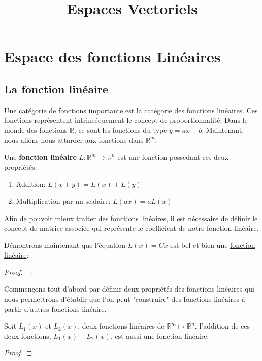 \documentclass[12pt]{report}
\title{Espaces Vectoriels}
\let\Bbb\mathbb
\theoremstyle{definition}
\begin{document}
\chapter{Espace des fonctions Linéaires}
\section{La fonction linéaire}
    Une catégorie de fonctions importante est la catégorie des fonctions linéaires.
    Ces fonctions représentent intrinséquement le concept de proportionnalité. Dans 
    le monde des fonctions $\Bbb R$, ce sont les fonctions du type $y = ax + b$. Maintenant,
    nous allons nous attarder aux fonctions dans $\Bbb R^m$.
    \begin{defi}
        \label{def:fonction_lineaire}
        Une \textbf{fonction linéaire} $L: \Bbb R^m \mapsto \Bbb R^n$ est une fonction possèdant
        ces deux propriétés:
        \begin{enumerate}
            \setlength{\itemsep}{0pt}
            \item Addition: $L(x + y) = L(x) + L(y)$
            \item Multiplication par un scalaire: $L(ax) = aL(x)$
        \end{enumerate}
    \end{defi}
    Afin de pouvoir mieux traiter des fonctions linéaires, il est nécessaire
    de définir le concept de matrice associée qui représente le coefficient de notre 
    fonction linéaire.
    \begin{defi}
        \label{def:matrice_associee}
    \end{defi}
    Démontrons maintenant que l'équation $L(x) = Cx$ est bel et bien une \hyperref[def:fonction_lineaire]{fonction linéaire}:
    \begin{proof}
    \end{proof}
    Commençons tout d'abord par définir deux propriétés des fonctions linéaires qui nous 
    permettrons d'établir que l'on peut "construire" des fonctions linéaires à partir 
    d'autres fonctions linéaire.
    \begin{prop}
        \label{thm:addition_fonction_lineaire}
        Soit $L_1(x)$ et $L_2(x)$, deux fonctions linéaires de $\Bbb R^m \mapsto \Bbb R^n$.
        l'addition de ces deux fonctions, $L_1(x) + L_2(x)$, est aussi une fonction linéaire.
    \end{prop}
    \begin{proof}
    \end{proof}
    
\end{document}
